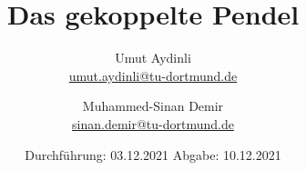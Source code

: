 

\subject{V106}
\title{Das gekoppelte Pendel}
\author{Umut Aydinli \\
 \href{mailto:umut.aydinli@tu-dortmund.de}{umut.aydinli@tu-dortmund.de}
 \and Muhammed-Sinan Demir \\
 \href{mailto:sinan.demir@tu-dortmund.de}{sinan.demir@tu-dortmund.de}
 }
\date{
  Durchführung: 03.12.2021
  \hspace{3em}
  Abgabe: 10.12.2021
}




\maketitle
\tableofcontents
\newpage




\newpage








\nocite{*}
\printbibliography{}

